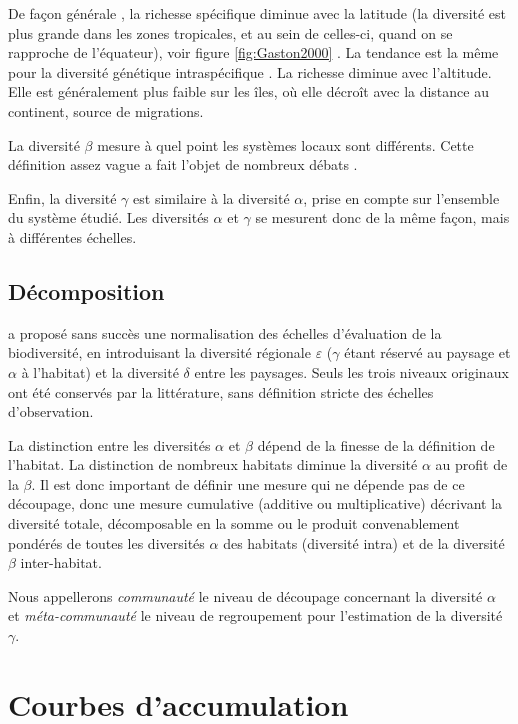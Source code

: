 \documentclass[
  11pt,
  american,
  a4paper,
  extrafontsizes,onecolumn,openright
  ]{memoir}
\begin{document}
De façon générale \autocite{Gaston2000}, la richesse spécifique diminue avec la latitude (la diversité est plus grande dans les zones tropicales, et au sein de celles-ci, quand on se rapproche de l'équateur), voir figure \ref{fig:Gaston2000} \autocite[figure 1]{Gaston2000}.
La tendance est la même pour la diversité génétique intraspécifique \autocite{Miraldo2016}.
La richesse diminue avec l'altitude.
Elle est généralement plus faible sur les îles, où elle décroît avec la distance au continent, source de migrations.

La diversité \(\beta\) mesure à quel point les systèmes locaux sont différents.
Cette définition assez vague a fait l'objet de nombreux débats \autocite{Moreno2010}.

Enfin, la diversité \(\gamma\) est similaire à la diversité \(\alpha\), prise en compte sur l'ensemble du système étudié.
Les diversités \(\alpha\) et \(\gamma\) se mesurent donc de la même façon, mais à différentes échelles.

\subsection{Décomposition}\label{duxe9composition}

\textcite{Whittaker1977} a proposé sans succès une normalisation des échelles d'évaluation de la biodiversité, en introduisant la diversité régionale \(\varepsilon\) (\(\gamma\) étant réservé au paysage et \(\alpha\) à l'habitat) et la diversité \(\delta\) entre les paysages.
Seuls les trois niveaux originaux ont été conservés par la littérature, sans définition stricte des échelles d'observation.

La distinction entre les diversités \(\alpha\) et \(\beta\) dépend de la finesse de la définition de l'habitat.
La distinction de nombreux habitats diminue la diversité \(\alpha\) au profit de la \(\beta\).
Il est donc important de définir une mesure qui ne dépende pas de ce découpage, donc une mesure cumulative (additive ou multiplicative) décrivant la diversité totale, décomposable en la somme ou le produit convenablement pondérés de toutes les diversités \(\alpha\) des habitats (diversité intra) et de la diversité \(\beta\) inter-habitat.

Nous appellerons \emph{communauté} le niveau de découpage concernant la diversité \(\alpha\) et \emph{méta-communauté} le niveau de regroupement pour l'estimation de la diversité \(\gamma\).

\section{Courbes d'accumulation}\label{courbes-daccumulation}
\end{document}
